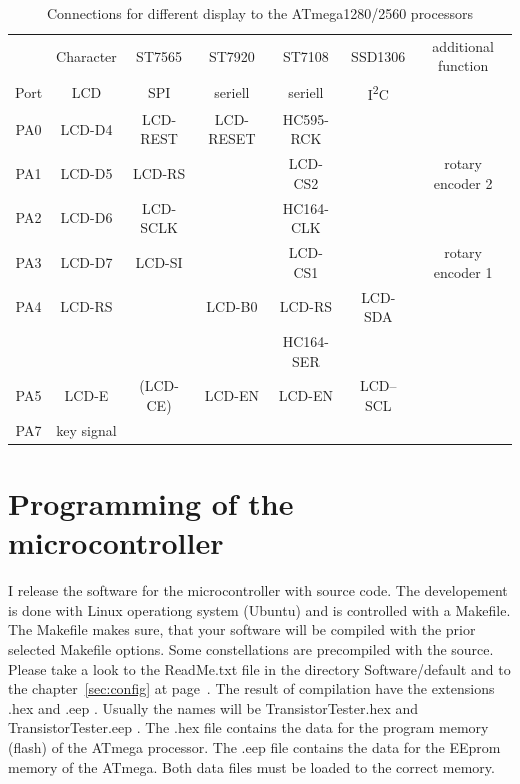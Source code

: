 \begin{table}[H]
  \begin{center}
    \begin{tabular}{| c || c | c | c | c | c | c |}
    \hline
           & Character     &  ST7565     & ST7920       & ST7108       & SSD1306     & additional function \\
      Port & LCD           &    SPI      & seriell      & seriell      &    I\textsuperscript{2}C      & \\
    \hline
    \hline
    PA0    &  LCD-D4       &   LCD-REST  &  LCD-RESET   & HC595-RCK      &             & \\
    \hline
    PA1    &  LCD-D5       &   LCD-RS    &              & LCD-CS2        &             & rotary encoder 2 \\
    \hline
    PA2    &  LCD-D6       &   LCD-SCLK  &              & HC164-CLK      &             & \\
    \hline
    PA3    &  LCD-D7       &   LCD-SI    &              & LCD-CS1        &             & rotary encoder 1 \\
    \hline
    PA4    &  LCD-RS       &             &   LCD-B0     & LCD-RS         &   LCD-SDA   & \\
           &               &             &              & HC164-SER      &             & \\
    \hline
    PA5    &  LCD-E        &   (LCD-CE)  &   LCD-EN     & LCD-EN         &   LCD--SCL  & \\
    \hline
    PA7    &  key signal   &             &              &                &             & \\
    \hline
    \end{tabular}
  \end{center}
  \caption{Connections for different display to the ATmega1280/2560 processors}
  \label{tab:display-1280}
\end{table}


\section{Programming of the microcontroller}
I release the software for the microcontroller with source code.
The developement is done with Linux operationg system (Ubuntu) and
is controlled with a Makefile. The Makefile makes sure, that your
software will be compiled with the prior selected Makefile options. Some constellations
are precompiled with the source. Please take a look to the ReadMe.txt file
in the directory Software/default and to the chapter~\ref{sec:config} at page~\pageref{sec:config}.
The result of compilation have the extensions .hex and .eep .
Usually the names will be TransistorTester.hex and TransistorTester.eep .
The .hex file contains the data for the program memory (flash) of the ATmega processor.
The .eep file contains the data for the EEprom memory of the ATmega. Both data files
must be loaded to the correct memory.

